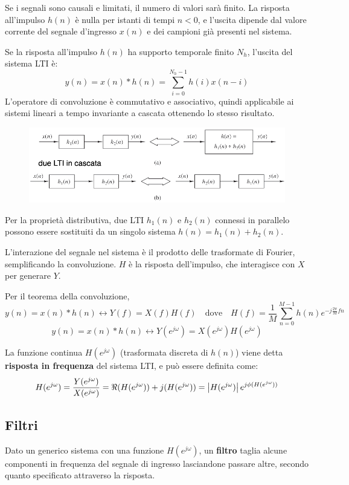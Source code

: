 Se i segnali sono causali e limitati, il numero di valori sarà finito. La risposta all'impulso $h(n)$ è nulla per istanti di tempi $n < 0$, e l'uscita dipende dal valore corrente del segnale d'ingresso $x(n)$ e dei campioni già presenti nel sistema. 

Se la risposta all'impulso $h(n)$ ha supporto temporale finito $N_h$, l'uscita del sistema LTI è:
$$y(n) = x(n) * h(n) = \sum_{i=0}^{N_h-1}h(i)x(n - i)$$
L'operatore di convoluzione è commutativo e associativo, quindi applicabile ai sistemi lineari a tempo invariante a cascata ottenendo lo stesso risultato.

\begin{figure}[h]
	\centering
	\includegraphics[scale=0.4]{Lezioni/Immagini/associativa}
\end{figure}

Per la proprietà distributiva, due LTI $h_1(n)$ e $h_2(n)$ connessi in parallelo possono essere sostituiti da un singolo sistema $h(n) = h_1(n) + h_2(n)$.

L'interazione del segnale nel sistema è il prodotto delle trasformate di Fourier, semplificando la convoluzione. $H$ è la risposta dell'impulso, che interagisce con $X$ per generare $Y$.  

Per il teorema della convoluzione, 
$$y(n) = x(n) * h(n) \leftrightarrow Y(f) = X(f)H(f) \quad \text{dove}\quad H(f) = \frac{1}{M} \sum_{n=0}^{M-1} h(n) e^{-j\frac{2\pi}{M}fn}$$
$$y(n) = x(n) * h(n) \leftrightarrow Y(e^{j\omega}) = X(e^{j\omega}) H(e^{j\omega})$$

La funzione continua $H(e^{j\omega})$ (trasformata discreta di $h(n)$) viene detta \textbf{risposta in frequenza} del sistema LTI, e può essere definita come:
$$H(e^{j\omega}) = \frac{Y(e^{j\omega})}{X(e^{j\omega})} = \Re(H(e^{j\omega})) + j(H(e^{j\omega})) = \left|H(e^{j\omega})\right| e^{j\phi(H(e^{j\omega}))}$$

\subsection{Filtri}
Dato un generico sistema con una funzione $H(e^{j\omega})$, un \textbf{filtro} taglia alcune componenti in frequenza del segnale di ingresso lasciandone passare altre, secondo quanto specificato attraverso la risposta. 


